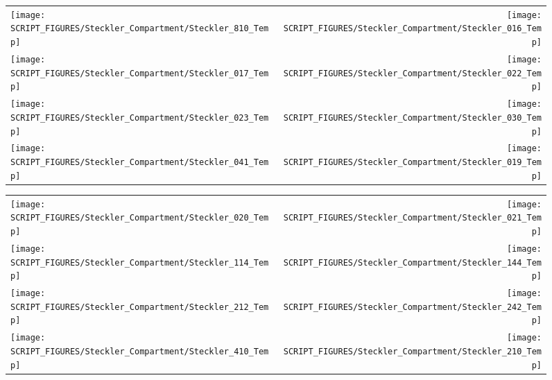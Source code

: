\begin{figure}[p]
\begin{tabular*}{\textwidth}{l@{\extracolsep{\fill}}r}
\texttt{[image: SCRIPT\_FIGURES/Steckler\_Compartment/Steckler\_810\_Temp]} &
\texttt{[image: SCRIPT\_FIGURES/Steckler\_Compartment/Steckler\_016\_Temp]} \\
\texttt{[image: SCRIPT\_FIGURES/Steckler\_Compartment/Steckler\_017\_Temp]} &
\texttt{[image: SCRIPT\_FIGURES/Steckler\_Compartment/Steckler\_022\_Temp]} \\
\texttt{[image: SCRIPT\_FIGURES/Steckler\_Compartment/Steckler\_023\_Temp]} &
\texttt{[image: SCRIPT\_FIGURES/Steckler\_Compartment/Steckler\_030\_Temp]} \\
\texttt{[image: SCRIPT\_FIGURES/Steckler\_Compartment/Steckler\_041\_Temp]} &
\texttt{[image: SCRIPT\_FIGURES/Steckler\_Compartment/Steckler\_019\_Temp]}
\end{tabular*}
\label{Steckler_Temp_2}
\end{figure}

\begin{figure}[p]
\begin{tabular*}{\textwidth}{l@{\extracolsep{\fill}}r}
\texttt{[image: SCRIPT\_FIGURES/Steckler\_Compartment/Steckler\_020\_Temp]} &
\texttt{[image: SCRIPT\_FIGURES/Steckler\_Compartment/Steckler\_021\_Temp]} \\
\texttt{[image: SCRIPT\_FIGURES/Steckler\_Compartment/Steckler\_114\_Temp]} &
\texttt{[image: SCRIPT\_FIGURES/Steckler\_Compartment/Steckler\_144\_Temp]} \\
\texttt{[image: SCRIPT\_FIGURES/Steckler\_Compartment/Steckler\_212\_Temp]} &
\texttt{[image: SCRIPT\_FIGURES/Steckler\_Compartment/Steckler\_242\_Temp]} \\
\texttt{[image: SCRIPT\_FIGURES/Steckler\_Compartment/Steckler\_410\_Temp]} &
\texttt{[image: SCRIPT\_FIGURES/Steckler\_Compartment/Steckler\_210\_Temp]}
\end{tabular*}
\label{Steckler_Temp_3}
\end{figure}

